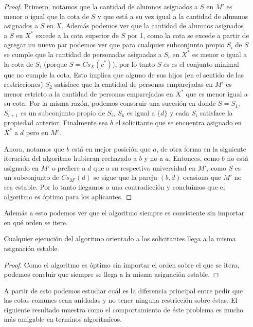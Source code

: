 \begin{proof}
Primero, notamos que la cantidad de alumnos asignados a $S$ en $M'$ es menor o igual que la cota de $S$ y que está a su vez igual a la cantidad de alumnos asignados a $S$ en $X$. Además podemos ver que la cantidad de alumnos asignados a $S$ en $X^*$ excede a la cota superior de $S$ por 1, como la cota se excede a partir de agregar un nuevo par podemos ver que para cualquier subconjunto propio $S_i$ de $S$ se cumple que la cantidad de personadas asignadas a $S_i$ en $X^*$ es menor o igual a la cota de $S_i$ (porque $S=Cs_X(c^*)$), por lo tanto $S$ es es el conjunto minimal que no cumple la cota. Esto implica que alguno de sus hijos (en el sentido de las restricciones) $S_2$ satisface que la cantidad de personas emparejadas en $M'$ es menor estricto a la cantidad de personas emparejadas en $X^*$ que es menor igual a su cota. Por la misma razón, podemos construir una sucesión en donde $S=S_1$, $S_{i+1}$ es un subconjunto propio de $S_i$, $S_{k}$ es igual a $\{d\}$ y cada $S_i$ satisface la propiedad anterior. Finalmente sea $b$ el solicitante que se encuentra asignado en $X^*$ a $d$ pero en $M'$. 

Ahora, notamos que $b$ está en mejor posición que $a$, de otra forma en la siguiente iteración del algoritmo hubieran rechazado a $b$ y no a $a$. Entonces, como $b$ no está asignado en $M'$ o prefiere a $d$ que a su respectiva universidad en $M'$, como $S$ es un subconjunto de  $Cs_{M'}(d)$ se sigue que la pareja $(b,d)$ ocasiona que $M'$ no sea estable. Por lo tanto llegamos a una contradicción y concluimos que el algoritmo es óptimo para los aplicantes. 
\end{proof}

Además a esto podemos ver que el algoritmo siempre es consistente sin importar en qué orden se itere. 

\begin{cor}
Cualquier ejecución del algoritmo orientado a los solicitantes llega a la misma asignación estable. 
\end{cor}
\begin{proof}
Como el algoritmo es óptimo sin importar el orden sobre el que se itera, podemos concluir que siempre se llega a la misma asignación estable.
\end{proof}

A partir de esto podemos estudiar cuál es la diferencia principal entre pedir que las cotas comunes sean anidadas y no tener ninguna restricción sobre éstas. El siguiente resultado muestra como el comportamiento de éste problema es mucho más amigable en terminos algorítmicos. 

